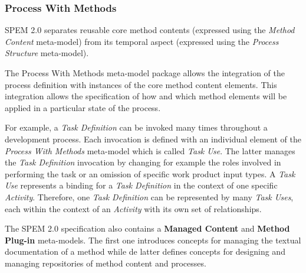 \subsubsection{Process With Methods}

SPEM 2.0 separates reusable core method contents (expressed using the \textit{Method Content} meta-model) from its temporal aspect (expressed using the \textit{Process Structure} meta-model). 

The Process With Methods meta-model package allows the integration of the process definition with instances of the core method content elements. This integration allows the specification of how and which method elements will be applied in a particular state of the process. 

For example, a \textit{Task Definition} can be invoked many times throughout a development process. Each invocation is defined with an individual element of the \textit{Process With Methods} meta-model which is called \textit{Task Use}. The latter manages the \textit{Task Definition} invocation by changing for example the roles involved in performing the task or an omission of specific work product input types. A \textit{Task Use} represents a binding for a \textit{Task Definition} in the context of one specific \textit{Activity}. Therefore, one \textit{Task Definition} can be represented by many \textit{Task Uses}, each within the context of an \textit{Activity} with its own set of relationships.

The SPEM 2.0 specification also contains a \textbf{Managed Content} and \textbf{Method Plug-in} meta-models. The first one introduces concepts for managing the textual documentation of a method while de latter defines concepts for designing and managing repositories of method content and processes.
